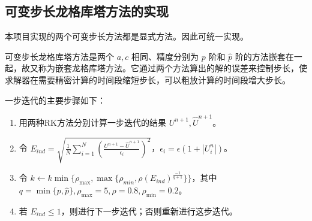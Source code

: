 \documentclass{ctexart}
\begin{document}
\subsection{可变步长龙格库塔方法的实现}

本项目实现的两个可变步长方法都是显式方法。因此可统一实现。

可变步长龙格库塔方法是两个 $a,c$ 相同、精度分别为 $p$ 阶和 $\hat{p}$ 阶的方法嵌套在一起，故又称为嵌套龙格库塔方法。它通过两个方法算出的解的误差来控制步长，使求解器在需要精密计算的时间段缩短步长，可以粗放计算的时间段增大步长。

一步迭代的主要步骤如下：

\begin{enumerate}
	\item 用两种RK方法分别计算一步迭代的结果 $U^{n+1},\hat{U}^{n+1}$。
	\item 令 $E_{ind}=\sqrt{\frac 1N\sum_{i=1}^N(\frac {U^{n+1}-\hat{U}^{n+1}}{\epsilon_i})^2}$，$\epsilon_i = \epsilon(1+|U^n_i|)$。
	\item 令 $k\leftarrow k\min\{\rho_{\max},\max\{\rho_{min},\rho(E_{ind})^{\frac {-1}{q+1}}\}\}$，其中 $q=\min\{p,\hat{p}\},\rho_{\max}=5,\rho=0.8,\rho_{\min}=0.2$。
	\item 若 $E_{ind}\leq 1$，则进行下一步迭代；否则重新进行这步迭代。
\end{enumerate}
\end{document}
